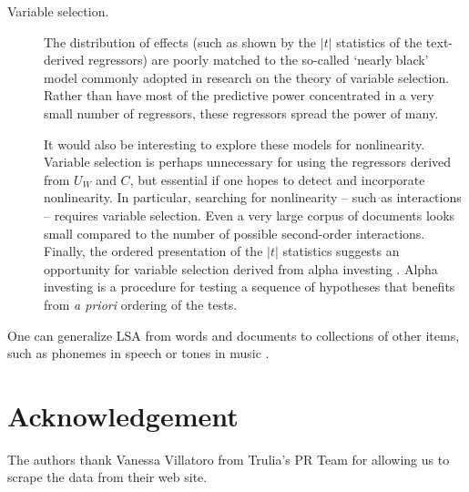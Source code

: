 \documentclass[12pt]{article}
\begin{document}
\begin{description}
   \item[Variable selection.]  The distribution of effects (such as shown by the $|t|$ statistics of the text-derived regressors) are poorly matched to the so-called `nearly black' model commonly adopted in research on the theory of variable selection.  Rather than have most of the predictive power concentrated in a very small number of regressors, these regressors spread the power of many.  
   
   It would also be interesting to explore these models for nonlinearity. Variable selection is perhaps unnecessary for using the regressors derived from $U_W$ and $C$, but essential if one hopes to detect and incorporate nonlinearity. In particular, searching for nonlinearity -- such as interactions -- requires variable selection.  Even a very large corpus of documents looks small compared to the number of possible second-order interactions.  Finally, the ordered presentation of the $|t|$ statistics suggests an opportunity for variable selection derived from alpha investing \citep{fosterstine08}.  Alpha investing is a procedure for testing a sequence of hypotheses that benefits from {\it a priori} ordering of the tests.
   
   \end{description}

One can generalize LSA from words and documents to collections of other items,
 such as phonemes in speech or tones in music \cite[called latent semantic
 mappingin][]{bellegarda05}.



\section*{Acknowledgement}

The authors thank Vanessa Villatoro from Trulia's PR Team for allowing us to scrape the data from their web site.





\end{document}
